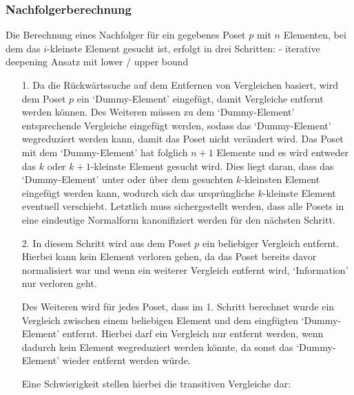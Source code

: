 \documentclass[10pt,journal,compsoc]{IEEEtran}
\begin{document}
\subsubsection{Nachfolgerberechnung}
Die Berechnung eines Nachfolger für ein gegebenes Poset $p$ mit $n$ Elementen, bei dem das $i$-kleinste Element gesucht ist, erfolgt in drei Schritten:
- iterative deepening Ansatz mit lower / upper bound
\begin{itemize}
  \item[1.]
    Da die Rückwärtssuche auf dem Entfernen von Vergleichen basiert, wird dem Poset $p$ ein `Dummy-Element' eingefügt, damit Vergleiche entfernt werden können.
    Des Weiteren müssen zu dem `Dummy-Element' entsprechende Vergleiche eingefügt werden, sodass das `Dummy-Element' wegreduziert werden kann, damit das Poset nicht verändert wird.
    Das Poset mit dem `Dummy-Element' hat folglich $n + 1$ Elemente und es wird entweder das $k$ oder $k + 1$-kleinste Element gesucht wird.
    Dies liegt daran, dass das `Dummy-Element' unter oder über dem gesuchten $k$-kleinsten Element eingefügt werden kann, wodurch sich das ursprüngliche $k$-kleinste Element eventuell verschiebt.
    Letztlich muss sichergestellt werden, dass alle Posets in eine eindeutige Normalform kanonifiziert werden für den nächsten Schritt.

  \item[2.]
    In diesem Schritt wird aus dem Poset $p$ ein beliebiger Vergleich entfernt.
    Hierbei kann kein Element verloren gehen, da das Poset bereits davor normalisiert war und wenn ein weiterer Vergleich entfernt wird, `Information' nur verloren geht. %

    Des Weiteren wird für jedes Poset, dass im 1. Schritt berechnet wurde ein Vergleich zwischen einem beliebigen Element und dem eingfügten `Dummy-Element' entfernt.
    Hierbei darf ein Vergleich nur entfernt werden, wenn dadurch kein Element wegreduziert werden könnte, da sonst das `Dummy-Element' wieder entfernt werden würde.

    Eine Schwierigkeit stellen hierbei die transitiven Vergleiche dar: \\
    \begin{figure}
\end{figure}
\end{itemize}
\end{document}
